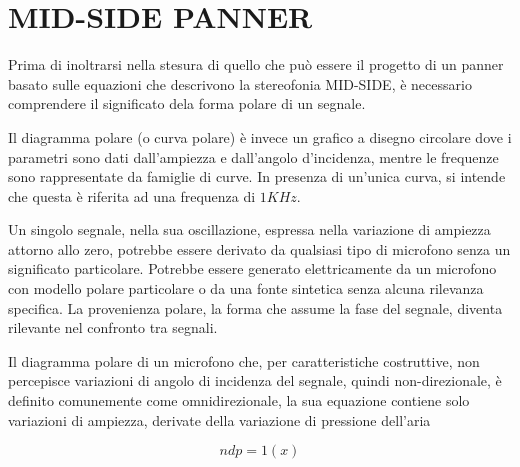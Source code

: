 \section{MID-SIDE PANNER}
\label{sec:mspanner}

Prima di inoltrarsi nella stesura di quello che può essere il progetto di un
panner basato sulle equazioni che descrivono la stereofonia MID-SIDE, è
necessario comprendere il significato dela forma polare di un segnale.

Il diagramma polare (o curva polare) è invece un grafico a disegno circolare
dove i parametri sono dati dall’ampiezza e dall’angolo d’incidenza, mentre le
frequenze sono rappresentate da famiglie di curve. In presenza di un’unica curva,
si intende che questa è riferita ad una frequenza di $1KHz$. %

Un singolo segnale, nella sua oscillazione, espressa nella variazione di ampiezza
attorno allo zero, potrebbe essere derivato da qualsiasi tipo di microfono senza
un significato particolare. Potrebbe essere generato elettricamente da un
microfono con modello polare particolare o da una fonte sintetica senza
alcuna rilevanza specifica. La provenienza polare, la forma che assume la fase
del segnale, diventa rilevante nel confronto tra segnali.

Il diagramma polare di un microfono che, per caratteristiche costruttive, non
percepisce variazioni di angolo di incidenza del segnale, quindi non-direzionale,
è definito comunemente come omnidirezionale, la sua equazione contiene solo
variazioni di ampiezza, derivate della variazione di pressione dell'aria

\begin{equation}
ndp = 1(x)
\label{eq:omni}
\end{equation}

